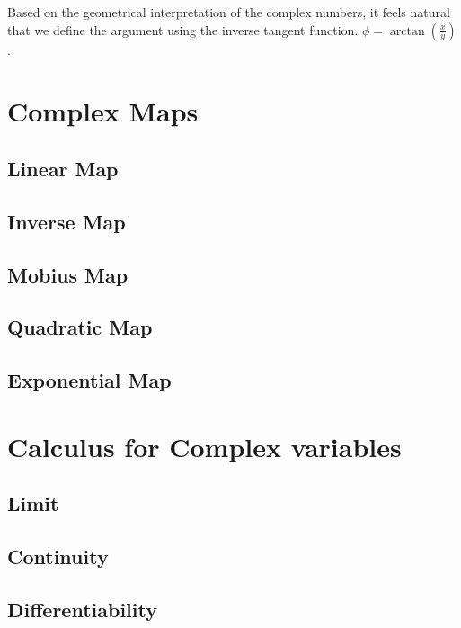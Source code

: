 Based on the geometrical interpretation of the complex numbers, it feels natural that we define the argument using the inverse tangent function. $\phi = \arctan(\frac{x}{y})$.




\section{Complex Maps}

\subsection{Linear Map}

\subsection{Inverse Map}

\subsection{Mobius Map}

\subsection{Quadratic Map}

\subsection{Exponential Map}


\section{Calculus for Complex variables}

\subsection{Limit}

\subsection{Continuity}

\subsection{Differentiability}

